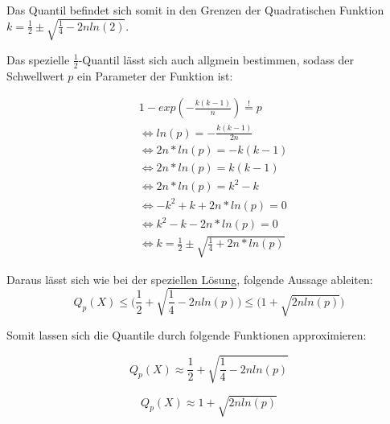 \documentclass[../main.tex]{subfiles}
\begin{document}
\begin{flushleft}
Das Quantil befindet sich somit in den Grenzen der Quadratischen Funktion $ k = \frac{ 1 }{ 2 } \pm \sqrt{ \frac{ 1 }{ 4 } - 2nln(2)} $. \newline

Das spezielle $ \frac{1}{2} $-Quantil lässt sich auch allgmein bestimmen, sodass der Schwellwert $p$ ein Parameter der Funktion ist:

\begin{align*}
& 1 - exp(-\frac{ k(k-1) }{ n }) \overset{!}{=} p \\
& \Leftrightarrow ln(p) = -\frac{ k(k-1)}{ 2n } \\
& \Leftrightarrow 2n*ln(p) = -k(k-1) \\
& \Leftrightarrow 2n*ln(p) = k(k-1) \\
& \Leftrightarrow 2n*ln(p) = k^{ 2 } - k \\
& \Leftrightarrow - k^{ 2 } + k + 2n*ln(p) = 0 \\
& \Leftrightarrow k^{ 2 } - k - 2n*ln(p) = 0 \\
& \Leftrightarrow k = \frac{ 1 }{ 2 } \pm \sqrt{ \frac{ 1 }{ 4 } + 2n*ln(p)}
\end{align*}

Daraus lässt sich wie bei der speziellen Lösung, folgende Aussage ableiten:
\begin{equation}
Q_{ p }(X) \leq \bigg( \frac{ 1 }{ 2 } + \sqrt{ \frac{ 1 }{ 4 } - 2nln(p)} \bigg) \leq \bigg(1+\sqrt{ 2nln(p) }\bigg)
\end{equation}

Somit lassen sich die Quantile durch folgende Funktionen approximieren:

\begin{equation}
Q_{ p }(X) \approx \frac{ 1 }{ 2 } + \sqrt{ \frac{ 1 }{ 4 } - 2nln(p)}
\end{equation}

\begin{equation}
Q_{ p }(X) \approx 1+\sqrt{ 2nln(p) }
\end{equation}







\end{flushleft}
\end{document}
